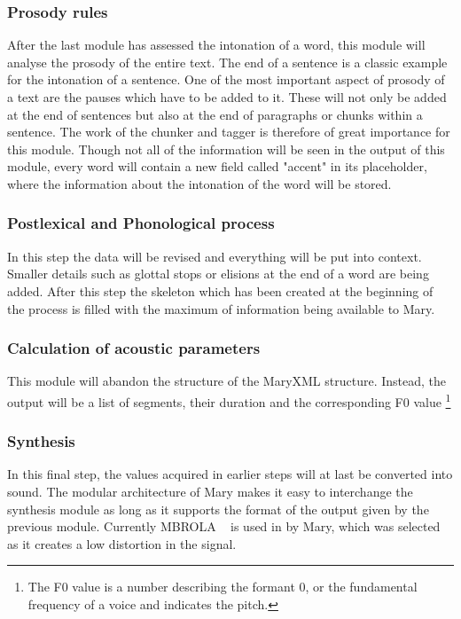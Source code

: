 \documentclass[a4paper, 12pt]{article}
\begin{document}
\subsubsection*{Prosody rules}

After the last module has assessed the intonation of a word, this module will analyse the prosody of the entire text.
The end of a sentence is a classic example for the intonation of a sentence. One of the most important aspect of prosody of a text are the pauses which have to be added to it.
These will not only be added at the end of sentences but also at the end of paragraphs or chunks within a sentence.
The work of the chunker and tagger is therefore of great importance for this module.
\newline
\indent Though not all of the information will be seen in the output of this module, every word will contain a new field called "accent" in its placeholder, where the information about the intonation of the word will be stored.

\subsubsection*{Postlexical and Phonological process}

In this step the data will be revised and everything will be put into context.
Smaller details such as glottal stops or elisions at the end of a word are being added.
After this step the skeleton which has been created at the beginning of the process is filled with the maximum of information being available to Mary.

\subsubsection*{Calculation of acoustic parameters}

This module will abandon the structure of the MaryXML structure.
Instead, the output will be a list of segments, their duration and the corresponding F0 value \footnote {The F0 value is a number describing the formant 0, or the fundamental frequency of a voice and indicates the pitch.}

\subsubsection*{Synthesis}
In this final step, the values acquired in earlier steps will at last be converted into sound.
The modular architecture of Mary makes it easy to interchange the synthesis module as long as it supports the format of the output given by the previous module.
Currently MBROLA ~\cite{dutoit1996mbrola} is used in by Mary, which was selected as it creates a low distortion in the signal.
\end{document}
